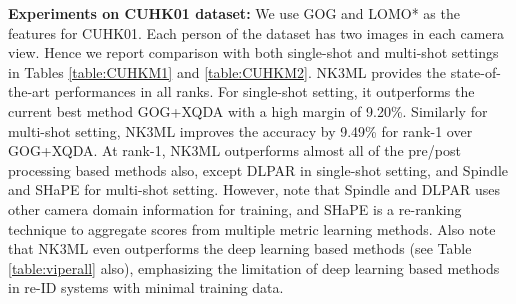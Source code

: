 \documentclass[runningheads]{llncs}
\begin{document}
\begin{table}[t]
\begin{center}
{}
\end{center}
\label{table:CUHK}
\end{table}

\setlength{\parskip}{1mm}
\noindent\textbf{Experiments on CUHK01 dataset:}
We use GOG and LOMO* as the features for CUHK01. Each person of the dataset has two images in each camera view. Hence we report comparison with both single-shot and multi-shot settings in Tables \ref{table:CUHKM1} and \ref{table:CUHKM2}. NK3ML provides the state-of-the-art performances in all ranks. For single-shot setting, it outperforms the current best method GOG+XQDA\cite{GOG} with a high margin of 9.20\%. Similarly for multi-shot setting, NK3ML improves the accuracy by  9.49\% for rank-1 over GOG+XQDA. At rank-1, NK3ML outperforms almost all of the pre/post processing based methods also, except DLPAR\cite{DLPAR} in single-shot setting, and Spindle\cite{SpindleNet} and SHaPE\cite{SHaPE} for multi-shot setting. However, note that Spindle and DLPAR uses other camera domain information for training, and SHaPE is a re-ranking technique to aggregate scores from multiple metric learning methods. Also note that NK3ML even outperforms the deep learning based methods
 (see Table \ref{table:viperall} also),
emphasizing the limitation of deep learning based methods in re-ID systems with minimal training data.
\setlength{\parskip}{0mm}
\end{document}

